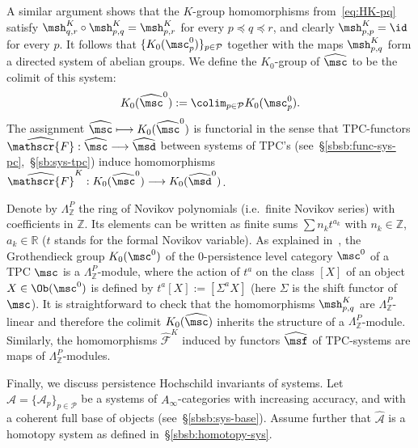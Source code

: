 A similar argument shows that the $K$-group homomorphisms
from~\eqref{eq:HK-pq} satisfy
$\msh^K_{q,r} \circ \msh^K_{p,q} = \msh^K_{p,r}$ for every
$p\preceq q \preceq r$, and clearly $\msh^K_{p,p} = \id$ for every
$p$. It follows that $\{K_0(\msc_p^0)\}_{p \in \mathcal{P}}$ together
with the maps $\msh^{K}_{p,q}$ form a directed system of abelian
groups.  We define the $K_0$-group of $\widehat{\msc}$ to be the
colimit of this system:
\begin{equation} \label{eq:K-colim} K_0(\widehat{\msc}^0) := \colim_{p
    \in \mathcal{P}} K_0(\msc_p^0).
\end{equation}
The assignment $\widehat{\msc} \longmapsto K_0(\widehat{\msc}^0)$ is
functorial in the sense that TPC-functors
$\widehat{\mathscr{F}}: \widehat{\msc} \longrightarrow \widehat{\msd}$
between systems of TPC's
(see~\S\ref{sbsb:func-sys-pc},~\S\ref{sb:sys-tpc}) induce
homomorphisms
$\widehat{\mathscr{F}}^K: K_0(\widehat{\msc}^0) \longrightarrow
K_0(\widehat{\msd}^0)$.

\begin{rem} \label{r:K-Nov} Denote by $\Lambda^P_{\mathbb{Z}}$ the
  ring of Novikov polynomials (i.e.~finite Novikov series) with
  coefficients in $\mathbb{Z}$. Its elements can be written as finite
  sums $\sum n_k t^{a_k}$ with $n_k \in \mathbb{Z}$,
  $a_k \in \mathbb{R}$ ($t$ stands for the formal Novikov
  variable). As explained in~\cite{BCZ:PKth}, the Grothendieck group
  $K_0(\msc^0)$ of the $0$-persistence level category $\msc^0$ of a
  TPC $\msc$ is a $\Lambda^P_{\mathbb{Z}}$-module, where the action of
  $t^a$ on the class $[X]$ of an object $X \in \Ob(\msc^0)$ is defined
  by $t^{a}[X] := [\Sigma^a X]$ (here $\Sigma$ is the shift functor of
  $\msc$). It is straightforward to check that the homomorphisms
  $\msh^K_{p,q}$ are $\Lambda^P_{\mathbb{Z}}$-linear and therefore the
  colimit $K_0(\widehat{\msc})$ inherits the structure of a
  $\Lambda^P_{\mathbb{Z}}$-module. Similarly, the homomorphisms
  $\widehat{\mathscr{F}}^K$ induced by functors $\widehat{\msf}$ of TPC-systems
  are maps of $\Lambda^P_{\mathbb{Z}}$-modules.
\end{rem}

Finally, we discuss persistence Hochschild invariants of
  systems. Let
$\widehat{\mathcal{A}} = \{\mathcal{A}_p\}_{p \in \mathcal{P}}$ be a
systems of $A_{\infty}$-categories with increasing accuracy, and with a
coherent full base of objects (see~\S\ref{sbsb:sys-base}). Assume
further that $\widehat{\mathcal{A}}$ is a homotopy system as defined
in~\S\ref{sbsb:homotopy-sys}.

